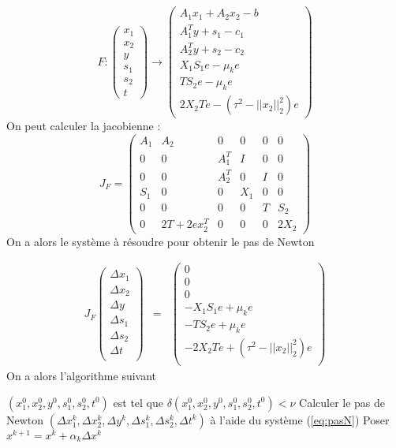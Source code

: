 $$
F : \begin{pmatrix}
x_1 \\ x_2 \\ y \\ s_1 \\ s_2 \\ t
\end{pmatrix}
\rightarrow
\begin{pmatrix}
A_1x_1+A_2x_2-b \\
A^T_1y + s_1 -c_1 \\
A_2^Ty + s_2 - c_2 \\
X_1S_1e - \mu_k e \\
TS_2e - \mu_ke \\
2X_2Te - (\tau^2-||x_2||_2^2)e
\end{pmatrix}
$$
On peut calculer la jacobienne : 
$$J_F = \begin{pmatrix}
A_1 & A_2 & 0 & 0 & 0 & 0 \\
0 & 0 & A_1^T & I & 0 & 0 \\
0 & 0 & A_2^T & 0 & I & 0 \\
S_1 & 0 & 0 & X_1 & 0 & 0 \\
0 & 0 & 0 & 0 & T & S_2 \\
0 & 2T + 2ex_2^T & 0 & 0 & 0 & 2X_2 

\end{pmatrix}$$
On a alors le système à résoudre pour obtenir le pas de Newton

\begin{eqnarray}
J_F \begin{pmatrix}
\Delta x_1 \\
\Delta x_2 \\
\Delta y \\
\Delta s_1\\
\Delta s_2\\
\Delta t\\
\end{pmatrix} & = & \begin{pmatrix}
0 \\
0\\
0\\
-X_1S_1e+\mu_k e \\
-TS_2e + \mu_k e\\
-2X_2Te+ (\tau^2-||x_2||_2^2)e\\
\end{pmatrix}
\label{eq:pasN}
\end{eqnarray}
On a alors l'algorithme suivant
\begin{algorithm}[!h]
$(x_1^{0},x_2^{0},y^{0},s_1^{0},s_2^{0},t^{0})$ est tel que 
$\delta(x_1^{0},x_2^{0},y^{0},s_1^{0},s_2^{0},t^{0}) < \nu$
Calculer le pas de Newton $(\Delta x_1^{k},\Delta x_2^{k},\Delta y^{k},\Delta s_1^{k},\Delta s_2^{k},\Delta t^{k})$ à l'aide du système (\ref{eq:pasN})\;
Poser $x^{k+1} = x^k + \alpha_k \Delta x^k$
\end{algorithm}